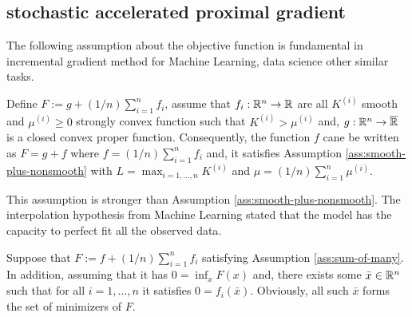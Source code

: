 \documentclass[12pt]{article}
\begin{document}
    
    \subsection{stochastic accelerated proximal gradient}
        The following assumption about the objective function is fundamental in incremental gradient method for Machine Learning, data science other similar tasks. 
        \begin{assumption}\label{ass:sum-of-many}
            Define $F := g + (1/n)\sum_{i = 1}^{n} f_i$, assume that $f_i:\mathbb R^n \rightarrow  \mathbb R$ are all $K^{(i)}$ smooth and $\mu^{(i)} \ge 0$ strongly convex function such that $K^{(i)} > \mu^{(i)}$ and, $g:\mathbb R^n \rightarrow \overline {\mathbb R}$ is a closed convex proper function. 
            Consequently, the function $f$ cane be written as $F = g + f$ where $f = (1/n)\sum_{i = 1}^{n} f_i$ and, it satisfies Assumption \ref{ass:smooth-plus-nonsmooth} with $L = \max_{i = 1, \ldots, n}K^{(i)}$ and $\mu = (1/n)\sum_{i = 1}^{n}\mu^{(i)}$. 
        \end{assumption}
        This assumption is stronger than Assumption \ref{ass:smooth-plus-nonsmooth}. 
        The interpolation hypothesis from Machine Learning stated that the model has the capacity to perfect fit all the observed data. 
        \begin{assumption}\label{ass:interp-hypothesis}
            Suppose that $F := f + (1/n)\sum_{i = 1}^{n} f_i$ satisfying Assumption \ref{ass:sum-of-many}. 
            In addition, assuming that it has $0 = \inf_{x}F(x)$ and, there exists some $\bar x \in \mathbb R^n$ such that for all $i = 1, \ldots, n$ it satisfies $0 = f_i(\bar x)$. 
            Obviously, all such $\bar x$ forms the set of minimizers of $F$. 
        \end{assumption}
\end{document}
